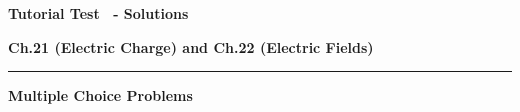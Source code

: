 \documentclass[8pt]{article}
\begin{document}




\begin{minipage}[t]{\textwidth}
\centerline{\textbf{\huge Tutorial Test \testNumber \ - Solutions}}
\vspace{0.1cm}
\centerline{\textbf{\large Ch.21 (Electric Charge) and Ch.22 (Electric Fields)}}
\vspace{0.5cm}
\noindent\rule[0.5ex]{\linewidth}{1pt}
\centerline{\textbf{\large Multiple Choice Problems}}
\vspace{0.2cm}
\end{minipage}

\newcommand{\testoneMCOneA } {(2) 1a.}					\vspace{0.3cm}

\newcommand{\testoneMCOneB } {(2) 1b.}					\vspace{0.3cm}

\newcommand{\testoneMCTwoA } {(2) 2a.}					\vspace{0.3cm}

\newcommand{\testoneMCTwoB } {(2) 2b.}					\vspace{0.3cm}

\newcommand{\testoneMCThreeA } {(2) 3a.}				\vspace{0.3cm}

\newcommand{\testoneMCThreeB } {(2) 3b.}				\vspace{0.3cm}

\newcommand{\testoneMCFourA } {(2) 4a.}				\vspace{0.3cm}

\newcommand{\testoneMCFourB } {(2) 4b.}				\vspace{0.3cm}

\newcommand{\testoneMCFiveA } {(2) 5a.}					\vspace{0.3cm}

\newcommand{\testoneMCFiveB } {(2) 5b.}				\vspace{0.3cm}

\newcommand{\testoneMCSixA } {(2) 6a.}					\vspace{0.3cm}
\end{document}
